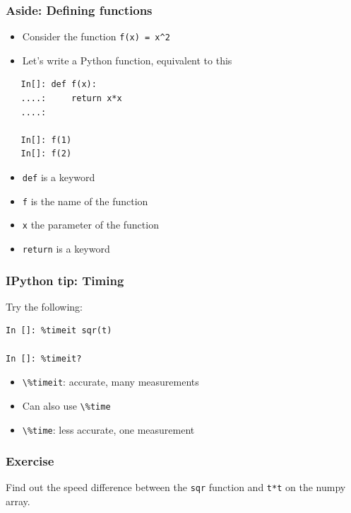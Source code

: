\documentclass[14pt,compress]{beamer}
\newcounter{time}
\newcommand{\inctime}[1]{\addtocounter{time}{#1}{\tiny \thetime\ m}}
\newcommand{\typ}[1]{\lstinline{#1}}
\begin{document}
\begin{frame}[fragile]
  \frametitle{Aside: Defining functions}
  \begin{itemize}
  \item Consider the function \texttt{f(x) = x\textasciicircum{}2}
  \item Let's write a Python function, equivalent to this
  \end{itemize}
  \begin{lstlisting}
   In[]: def f(x):
   ....:     return x*x
   ....:

   In[]: f(1)
   In[]: f(2)
  \end{lstlisting}
  \begin{itemize}
  \item \texttt{def} is a keyword
  \item \texttt{f} is the name of the function
  \item \texttt{x} the parameter of the function
  \item \texttt{return} is a keyword
  \end{itemize}
\end{frame}

\begin{frame}[fragile]
  \frametitle{IPython tip: Timing}

Try the following:
  \begin{lstlisting}
In []: %timeit sqr(t)

In []: %timeit?

  \end{lstlisting}

  \begin{itemize}
      \item \typ{\%timeit}: accurate, many measurements
      \item Can also use \typ{\%time}
      \item \typ{\%time}: less accurate, one measurement
  \end{itemize}

\inctime{15}
\end{frame}


\begin{frame}[fragile]
\frametitle{Exercise}
\begin{center}
    Find out the speed difference between the \typ{sqr} function and
    \typ{t*t} on the numpy array.
\end{center}

\end{frame}
\end{document}
